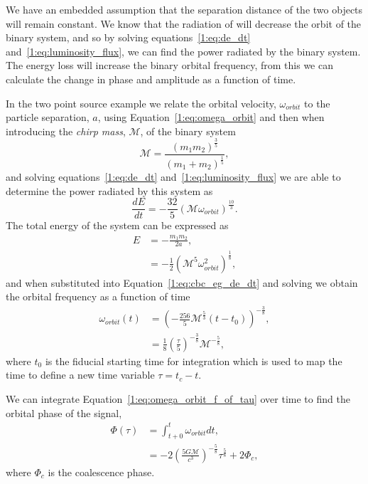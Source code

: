 We have an embedded assumption that the separation distance of the two objects will remain constant. We know that the radiation of \gws will decrease the orbit of the binary system, and so by solving equations~\ref{1:eq:de_dt} and~\ref{1:eq:luminosity_flux}, we can find the power radiated by the binary system. The energy loss will increase the binary orbital frequency, from this we can calculate the change in phase and amplitude as a function of time.

In the two point source example we relate the orbital velocity, $\omega_{orbit}$ to the particle separation, $a$, using Equation~\ref{1:eq:omega_orbit} and then when introducing the \textit{chirp mass}, $\mathcal{M}$, of the binary system
%
\begin{equation}
    \mathcal{M} = \frac{(m_{1}m_{2})^{\frac{3}{5}}}{(m_{1} + m_{2})^\frac{1}{5}},
\end{equation}
%
and solving equations~\ref{1:eq:de_dt} and~\ref{1:eq:luminosity_flux} we are able to determine the power radiated by this system as
%
\begin{equation}
    \frac{dE}{dt} = -\frac{32}{5}(\mathcal{M}\omega_{orbit})^\frac{10}{3}.
    \label{1:eq:cbc_eg_de_dt}
\end{equation}
%
The total energy of the system can be expressed as
%
\begin{align}
    E &= -\frac{m_{1}m_{2}}{2a}, \\
      &=-\frac{1}{2}(\mathcal{M}^{5} \omega^{2}_{orbit})^\frac{1}{8},
      \label{1:eq:total_energy_cbc}
\end{align}
%
and when substituted into Equation~\ref{1:eq:cbc_eg_de_dt} and solving we obtain the orbital frequency as a function of time
%
\begin{align}
    \omega_{orbit}(t) &= \left(-\frac{256}{5}\mathcal{M}^{\frac{5}{3}}(t - t_{0})\right)^{-\frac{3}{8}}, \\
                      &= \frac{1}{8}\left(\frac{\tau}{5}\right)^{-\frac{3}{8}}\mathcal{M}^{-\frac{5}{8}},
    \label{1:eq:omega_orbit_f_of_tau}
\end{align}
%
where $t_{0}$ is the fiducial starting time for integration which is used to map the time to define a new time variable $\tau = t_{c} - t$.


We can integrate Equation~\ref{1:eq:omega_orbit_f_of_tau} over time to find the orbital phase of the \gwadj signal,
%
\begin{align}
    \Phi(\tau) &= \int^{t}_{t+{0}} \omega_{orbit} dt, \\ 
    &= -2\left(\frac{5G\mathcal{M}}{c^{3}}\right)^{-\frac{5}{8}} \tau^{\frac{5}{8}} + 2\Phi_{c},
\end{align}
%
where $\Phi_{c}$ is the coalescence phase.


